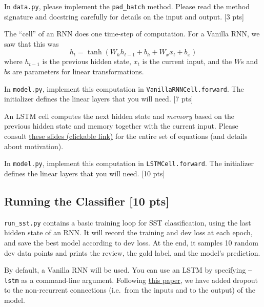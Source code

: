 \documentclass[11pt]{article}
\begin{document}
\noindent In \texttt{data.py}, please implement the \texttt{pad\_batch} method.  Please read the method signature and docstring carefully for details on the input and output. \hfill [3 pts]


\vspace{2em}
 The ``cell'' of an RNN does one time-step of computation.  For a Vanilla RNN, we saw that this was
\[ h_t = \tanh\left( W_h h_{t-1} + b_h + W_x x_t + b_x \right) \]
where $h_{t-1}$ is the previous hidden state, $x_t$ is the current input, and the $W$s and $b$s are parameters for linear transformations.

\noindent In \texttt{model.py}, implement this computation in \texttt{VanillaRNNCell.forward}.  The initializer defines the linear layers that you will need. \hfill [7 pts]


\vspace{2em}
 An LSTM cell computes the next hidden state and \emph{memory} based on the previous hidden state and memory together with the current input.  Please consult \href{https://www.shane.st/teaching/574/spr25/slides/8_lstm.pdf}{these slides (clickable link)} for the entire set of equations (and details about motivation).

\noindent In \texttt{model.py}, implement this computation in \texttt{LSTMCell.forward}.  The initializer defines the linear layers that you will need. \hfill [10 pts]



\subsection{Running the Classifier [10 pts]}

\texttt{run\_sst.py} contains a basic training loop for SST classification, using the last hidden state of an RNN. It will record the training and dev loss at each epoch, and save the best model according to dev loss.  At the end, it samples 10 random dev data points and prints the review, the gold label, and the model's prediction.

\vspace{2em}
 By default, a Vanilla RNN will be used.  You can use an LSTM by specifying \texttt{--lstm} as a command-line argument.  Following \href{https://arxiv.org/abs/1409.2329}{this paper}, we have added dropout to the non-recurrent connections (i.e.\ from the inputs and to the output) of the model.
\end{document}
